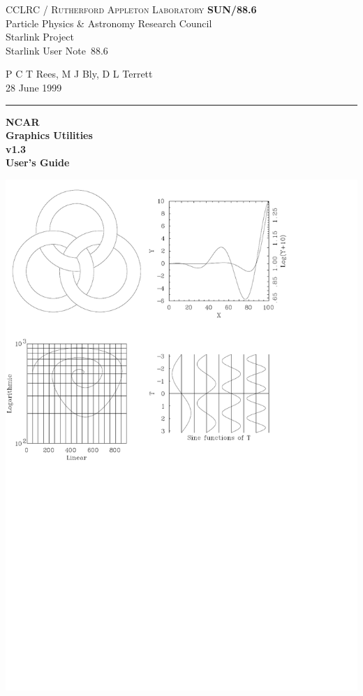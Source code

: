 \documentclass[twoside,11pt]{article}
\newcommand{\stardoccategory}  {Starlink User Note}
\newcommand{\stardocinitials}  {SUN}
\newcommand{\stardocnumber}    {88.6}
\newcommand{\stardocauthors}   {P C T Rees, M J Bly, D L Terrett}
\newcommand{\stardocdate}      {28 June 1999}
\newcommand{\stardoctitle}     {NCAR \\ [1ex] Graphics Utilities}
\newcommand{\stardocversion}   {v1.3}
\newcommand{\stardocmanual}    {User's Guide}
\newcommand{\stardocname}{\stardocinitials /\stardocnumber}
\newenvironment{latexonly}{}{}
\renewcommand{\_}{\texttt{\symbol{95}}}
\begin{document}
\thispagestyle{empty}

\begin{latexonly}
   CCLRC / \textsc{Rutherford Appleton Laboratory} \hfill \textbf{\stardocname}\\
   {\large Particle Physics \& Astronomy Research Council}\\
   {\large Starlink Project\\}
   {\large \stardoccategory\ \stardocnumber}
   \begin{flushright}
   \stardocauthors\\
   \stardocdate
   \end{flushright}
   \vspace{-4mm}
   \rule{\textwidth}{0.5mm}
   \vspace{5mm}
   \begin{center}
   {\Huge\textbf{\stardoctitle \\ [1.5ex]}}
   {\LARGE\textbf{\stardocversion \\ [2ex]}}
   {\Huge\textbf{\stardocmanual}}
   \end{center}
   \vspace{5mm}

\centering\includegraphics[viewport=0 360 450 800,scale=0.8,clip]{sun88_cover}


\end{latexonly}
\end{document}
